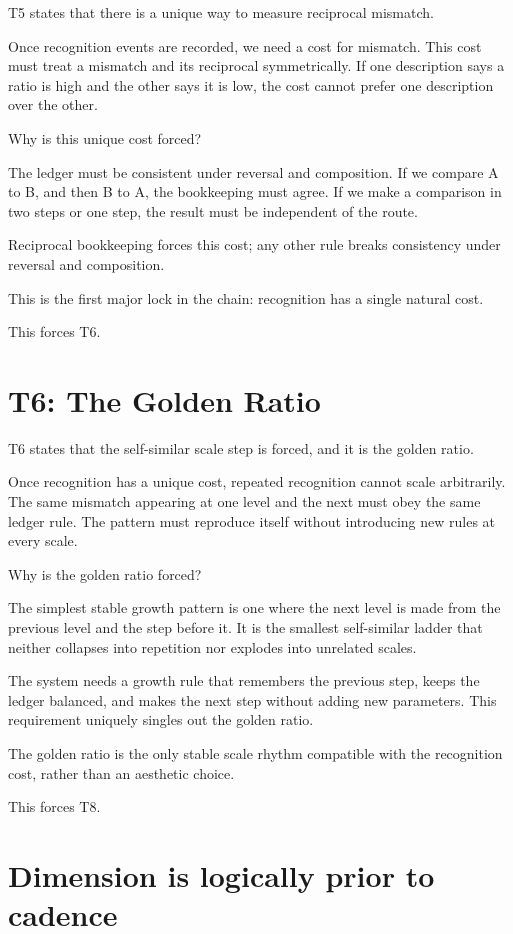 \documentclass[11pt]{article}
\begin{document}
T5 states that there is a unique way to measure reciprocal mismatch.

Once recognition events are recorded, we need a cost for mismatch. This cost must treat a mismatch and its reciprocal symmetrically. If one description says a ratio is high and the other says it is low, the cost cannot prefer one description over the other.

Why is this unique cost forced?

The ledger must be consistent under reversal and composition. If we compare A to B, and then B to A, the bookkeeping must agree. If we make a comparison in two steps or one step, the result must be independent of the route.

Reciprocal bookkeeping forces this cost; any other rule breaks consistency under reversal and composition.

This is the first major lock in the chain: recognition has a single natural cost.

This forces T6.

\section{T6: The Golden Ratio}

T6 states that the self-similar scale step is forced, and it is the golden ratio.

Once recognition has a unique cost, repeated recognition cannot scale arbitrarily. The same mismatch appearing at one level and the next must obey the same ledger rule. The pattern must reproduce itself without introducing new rules at every scale.

Why is the golden ratio forced?

The simplest stable growth pattern is one where the next level is made from the previous level and the step before it. It is the smallest self-similar ladder that neither collapses into repetition nor explodes into unrelated scales.

The system needs a growth rule that remembers the previous step, keeps the ledger balanced, and makes the next step without adding new parameters. This requirement uniquely singles out the golden ratio.

The golden ratio is the only stable scale rhythm compatible with the recognition cost, rather than an aesthetic choice.

This forces T8.

\section{Dimension is logically prior to cadence}
\end{document}
